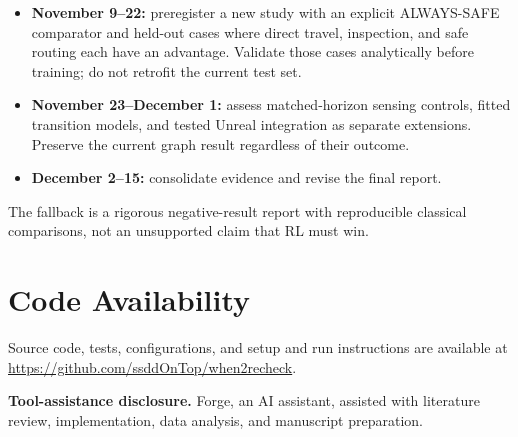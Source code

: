 \documentclass[journal]{IEEEtai}
\begin{document}
\begin{itemize}
\item \textbf{November 9--22:} preregister a new study with an explicit ALWAYS-SAFE comparator and held-out cases where direct travel, inspection, and safe routing each have an advantage. Validate those cases analytically before training; do not retrofit the current test set.
\item \textbf{November 23--December 1:} assess matched-horizon sensing controls, fitted transition models, and tested Unreal integration as separate extensions. Preserve the current graph result regardless of their outcome.
\item \textbf{December 2--15:} consolidate evidence and revise the final report.
\end{itemize}

The fallback is a rigorous negative-result report with reproducible classical comparisons, not an unsupported claim that RL must win.

\section*{Code Availability}
Source code, tests, configurations, and setup and run instructions are available at \url{https://github.com/ssddOnTop/when2recheck}.

\noindent\textbf{Tool-assistance disclosure.}
Forge, an AI assistant, assisted with literature review, implementation, data analysis, and manuscript preparation.

\label{report-body-end}
\clearpage


\end{document}

